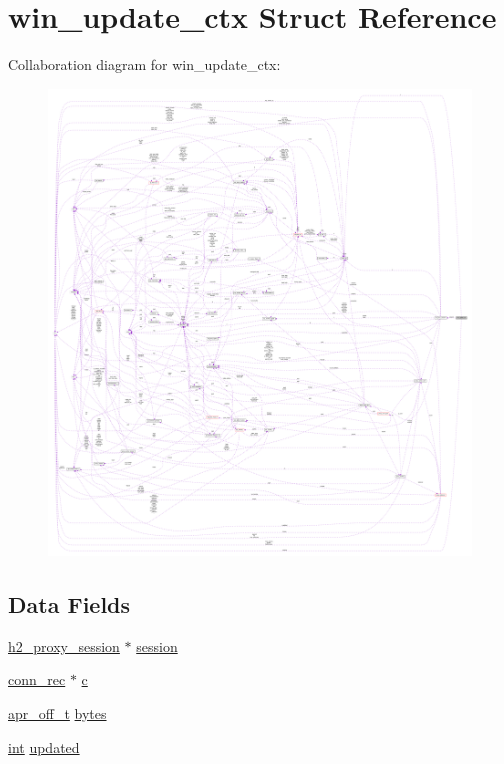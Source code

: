 \hypertarget{structwin__update__ctx}{}\section{win\+\_\+update\+\_\+ctx Struct Reference}
\label{structwin__update__ctx}


Collaboration diagram for win\+\_\+update\+\_\+ctx\+:
\nopagebreak
\begin{figure}[H]
\begin{center}
\leavevmode
\includegraphics[width=350pt]{structwin__update__ctx__coll__graph}
\end{center}
\end{figure}
\subsection*{Data Fields}
\begin{DoxyCompactItemize}
\item 
\hyperlink{structh2__proxy__session}{h2\+\_\+proxy\+\_\+session} $\ast$ \hyperlink{structwin__update__ctx_ae5bfe28fc96917de0833f68cdef78bbc}{session}
\item 
\hyperlink{structconn__rec}{conn\+\_\+rec} $\ast$ \hyperlink{structwin__update__ctx_a93823ecffa2e0f63b3d4f07fb62ca406}{c}
\item 
\hyperlink{group__apr__platform_ga6938af9075cec15c88299109381aa984}{apr\+\_\+off\+\_\+t} \hyperlink{structwin__update__ctx_afa6a82a253225a8e1df7e9de2e55ea28}{bytes}
\item 
\hyperlink{pcre_8txt_a42dfa4ff673c82d8efe7144098fbc198}{int} \hyperlink{structwin__update__ctx_a5f243df3ee2861c4948343595391bede}{updated}
\end{DoxyCompactItemize}


